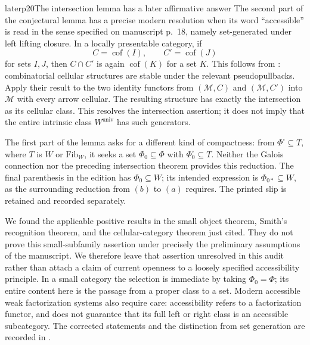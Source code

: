 
\begin{dcomment}{later}{p20}{The intersection lemma has a later affirmative answer}
The second part of the conjectural lemma has a precise modern resolution when its word ``accessible'' is read in the sense specified on manuscript p.~18, namely set-generated under left lifting closure. In a locally presentable category, if
\[
 C=\operatorname{cof}(I),\qquad C'=\operatorname{cof}(J)
\]
for sets $I,J$, then $C\cap C'$ is again $\operatorname{cof}(K)$ for a set $K$. This follows from \citet[Theorem~3.2 and Remark~3.8]{MakkaiRosicky2014Cellular}: combinatorial cellular structures are stable under the relevant pseudopullbacks. Apply their result to the two identity functors from $(\mathcal M,C)$ and $(\mathcal M,C')$ into $\mathcal M$ with every arrow cellular. The resulting structure has exactly the intersection as its cellular class. This resolves the intersection assertion; it does not imply that the entire intrinsic class $W^{\mathrm{univ}}$ has such generators.

The first part of the lemma asks for a different kind of compactness: from $\Phi^{\square}\subseteq T$, where $T$ is $W$ or $\mathrm{Fib}_W$, it seeks a set $\Phi_0\subseteq\Phi$ with $\Phi_0^{\square}\subseteq T$. Neither the Galois connection nor the preceding intersection theorem provides this reduction. The final parenthesis in the edition has $\Phi_0\subseteq W$; its intended expression is $\Phi_{0*}\subseteq W$, as the surrounding reduction from $(b)$ to $(a)$ requires. The printed slip is retained and recorded separately.

We found the applicable positive results in the small object theorem, Smith's recognition theorem, and the cellular-category theorem just cited. They do not prove this small-subfamily assertion under precisely the preliminary assumptions of the manuscript. We therefore leave that assertion unresolved in this audit rather than attach a claim of current openness to a loosely specified accessibility principle. In a small category the selection is immediate by taking $\Phi_0=\Phi$; its entire content here is the passage from a proper class to a set. Modern accessible weak factorization systems also require care: accessibility refers to a factorization functor, and does not guarantee that its full left or right class is an accessible subcategory. The corrected statements and the distinction from set generation are recorded in \citet[\S3, especially Remarks~3.2, 3.5 and Theorem~3.9]{Rosicky2021Remarks}.
\end{dcomment}


